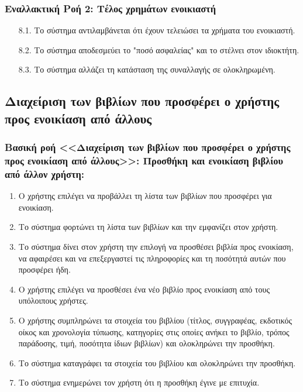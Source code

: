 \documentclass[12pt,a4paper]{article}
\begin{document}
\subsubsection*{Εναλλακτική Ροή 2: Τέλος χρημάτων ενοικιαστή}
\begin{enumerate}
    \item[8.1.] Το σύστημα αντιλαμβάνεται ότι έχουν τελειώσει τα χρήματα του ενοικιαστή.
    \item[8.2.] Το σύστημα αποδεσμεύει το "ποσό ασφαλείας" και το στέλνει στον ιδιοκτήτη.
    \item[8.3.] Το σύστημα αλλάζει τη κατάσταση της συναλλαγής σε ολοκληρωμένη.
\end{enumerate}

\subsection{Διαχείριση των βιβλίων που προσφέρει ο χρήστης προς ενοικίαση από άλλους}

\subsubsection*{Βασική ροή <<Διαχείριση των βιβλίων που προσφέρει ο χρήστης \\προς ενοικίαση από άλλους>>: Προσθήκη και ενοικίαση βιβλίου από άλλον χρήστη:}
\begin{enumerate}
    \item Ο χρήστης επιλέγει να προβάλλει τη λίστα των βιβλίων που προσφέρει για ενοικίαση.
    \item Το σύστημα φορτώνει τη λίστα των βιβλίων και την εμφανίζει στον χρήστη.
    \item Το σύστημα δίνει στον χρήστη την επιλογή να προσθέσει βιβλία προς ενοικίαση, να αφαιρέσει και να επεξεργαστεί τις πληροφορίες και τη ποσότητά αυτών που προσφέρει ήδη.
    \item Ο χρήστης επιλέγει να προσθέσει ένα νέο βιβλίο προς ενοικίαση από τους υπόλοιπους χρήστες.
    \item Ο χρήστης συμπληρώνει τα στοιχεία του βιβλίου (τίτλος, συγγραφέας, εκδοτικός οίκος και χρονολογία τύπωσης, κατηγορίες στις οποίες ανήκει το βιβλίο, τρόπος παράδοσης, τιμή, ποσότητα ίδιων βιβλίων) και ολοκληρώνει την προσθήκη.
    \item Το σύστημα καταγράφει τα στοιχεία του βιβλίου και ολοκληρώνει την προσθήκη.
    \item Το σύστημα ενημερώνει τον χρήστη ότι η προσθήκη έγινε με επιτυχία.
\end{enumerate}
\end{document}
